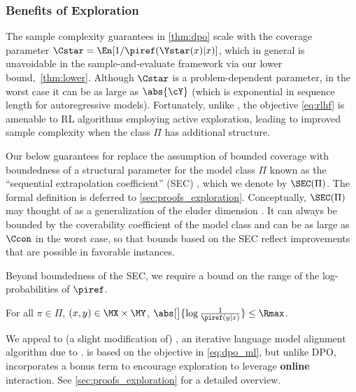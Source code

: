 






\subsubsection{Benefits of Exploration}\label{sec:benefits_exploration}
The sample complexity guarantees in \cref{thm:dpo} scale with the
coverage parameter $\Cstar = \En[1/\piref(\Ystar(x)|x)]$, which in
general is unavoidable in the sample-and-evaluate framework via our lower bound,~\cref{thm:lower}. Although $\Cstar$ is a problem-dependent parameter, in the worst case it can be as large as $\abs{\cY}$ (which is exponential in sequence length for autoregressive models). 
Fortunately, unlike
\bestofnalg, the \rlhfalg objective \eqref{eq:rlhf} is amenable to RL algorithms employing
active exploration, leading to improved sample complexity when the class $\Pi$ has additional structure. \loose

Our below guarantees for \rlhfalg replace the assumption of bounded coverage
with boundedness of a structural parameter for the model class
$\Pi$ known as the ``sequential extrapolation coefficient'' (SEC)
\citep{xie2023role,xie2024exploratory}, which we denote by $\SEC(\Pi)$. The formal definition is 
deferred to \cref{sec:proofs_exploration}. Conceptually,
$\SEC(\Pi)$ may thought of as a generalization of the eluder dimension
\citep{russo2013eluder,jin2021bellman}.  
It can always be bounded by the coverability coefficient of the model
class \citep{xie2024exploratory} and can be as large as $\Ccon$ in the worst case, so that bounds based on the SEC reflect improvements that are possible in favorable instances. 


Beyond boundedness of the SEC, we require a bound on the range of the log-probabilities of $\piref$.\loose
\begin{assumption}\label{assumption:xpo-bdr}
For all $\pi \in \Pi$, $(x,y) \in \MX\times \MY$, $\abs[\big]{\log \frac{1}{\piref(y|x)}} \leq \Rmax$.\loose
\end{assumption}

  We appeal to (a slight modification of)  \xpo, an iterative  language model alignment algorithm  due to
\cite{xie2024exploratory}. \xpo{} is based on the objective in
\cref{eq:dpo_ml}, but unlike DPO,  incorporates a bonus term to
encourage exploration to leverage \textbf{online} interaction. See \cref{sec:proofs_exploration} for a
detailed overview.
  



